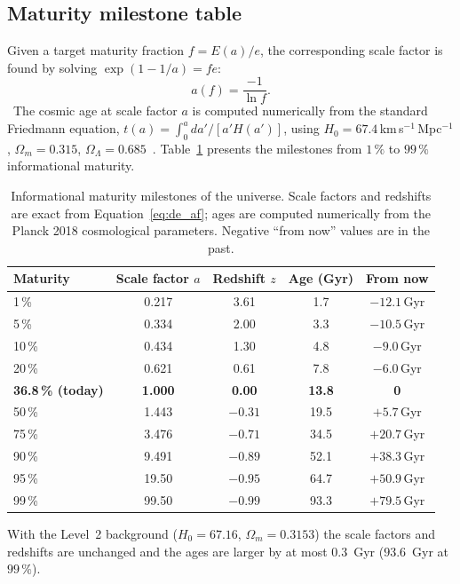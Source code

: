 \subsection{Maturity milestone table}
Given a target maturity fraction $f=E(a)/e$, the corresponding scale factor is found by solving $\exp(1-1/a)=fe$:
\begin{equation}a(f)=\frac{-1}{\ln f}.\label{eq:de_af}\end{equation}
\derived\ The cosmic age at scale factor $a$ is computed numerically from the standard Friedmann equation, $t(a)=\int_0^a da'/[a'H(a')]$, using
$H_0=67.4$\,km\,s$^{-1}$\,Mpc$^{-1}$, $\Omega_m=0.315$, $\Omega_\Lambda=0.685$~\cite{Planck2018VI}. Table~\ref{tab:de_maturity} presents the
milestones from $1\,\%$ to $99\,\%$ informational maturity.
\begin{table}[htbp]\centering\small
\caption{Informational maturity milestones of the universe. Scale factors and redshifts are exact from Equation~\eqref{eq:de_af}; ages are
computed numerically from the Planck 2018 cosmological parameters. Negative ``from now'' values are in the past. \calc}\label{tab:de_maturity}
\begin{tabular}{lcccc}\toprule
Maturity & Scale factor $a$ & Redshift $z$ & Age (Gyr) & From now\\\midrule
1\,\% & 0.217 & 3.61 & 1.7 & $-12.1$\,Gyr\\ 5\,\% & 0.334 & 2.00 & 3.3 & $-10.5$\,Gyr\\ 10\,\% & 0.434 & 1.30 & 4.8 & $-9.0$\,Gyr\\
20\,\% & 0.621 & 0.61 & 7.8 & $-6.0$\,Gyr\\ \textbf{36.8\,\% (today)} & \textbf{1.000} & \textbf{0.00} & \textbf{13.8} & \textbf{0}\\
50\,\% & 1.443 & $-0.31$ & 19.5 & $+5.7$\,Gyr\\ 75\,\% & 3.476 & $-0.71$ & 34.5 & $+20.7$\,Gyr\\ 90\,\% & 9.491 & $-0.89$ & 52.1 & $+38.3$\,Gyr\\
95\,\% & 19.50 & $-0.95$ & 64.7 & $+50.9$\,Gyr\\ 99\,\% & 99.50 & $-0.99$ & 93.3 & $+79.5$\,Gyr\\\bottomrule
\end{tabular}\end{table}
With the Level~2 background ($H_0=67.16$, $\Omega_m=0.3153$) the scale factors and redshifts are unchanged and the ages are larger by at most
$0.3$~Gyr ($93.6$~Gyr at $99\,\%$). \calc

